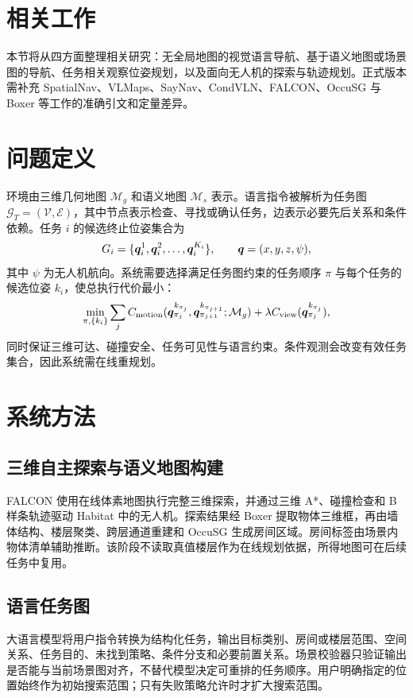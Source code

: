 \documentclass[UTF8,11pt]{ctexart}
\begin{document}
\section{相关工作}
本节将从四方面整理相关研究：无全局地图的视觉语言导航、基于语义地图或场景图的导航、任务相关观察位姿规划，以及面向无人机的探索与轨迹规划。正式版本需补充 SpatialNav、VLMaps、SayNav、CondVLN、FALCON、OccuSG 与 Boxer 等工作的准确引文和定量差异。

\section{问题定义}
环境由三维几何地图 $\mathcal{M}_g$ 和语义地图 $\mathcal{M}_s$ 表示。语言指令被解析为任务图 $\mathcal{G}_T=(\mathcal{V},\mathcal{E})$，其中节点表示检查、寻找或确认任务，边表示必要先后关系和条件依赖。任务 $i$ 的候选终止位姿集合为
\begin{equation}
G_i=\{\bm{q}_i^1,\bm{q}_i^2,\ldots,\bm{q}_i^{K_i}\},\qquad
\bm{q}=(x,y,z,\psi),
\end{equation}
其中 $\psi$ 为无人机航向。系统需要选择满足任务图约束的任务顺序 $\pi$ 与每个任务的候选位姿 $k_i$，使总执行代价最小：
\begin{equation}
\min_{\pi,\{k_i\}}\sum_j C_{\mathrm{motion}}
(\bm{q}_{\pi_j}^{k_{\pi_j}},\bm{q}_{\pi_{j+1}}^{k_{\pi_{j+1}}};\mathcal{M}_g)
+\lambda C_{\mathrm{view}}(\bm{q}_{\pi_j}^{k_{\pi_j}}),
\end{equation}
同时保证三维可达、碰撞安全、任务可见性与语言约束。条件观测会改变有效任务集合，因此系统需在线重规划。

\section{系统方法}
\subsection{三维自主探索与语义地图构建}
FALCON 使用在线体素地图执行完整三维探索，并通过三维 A*、碰撞检查和 B 样条轨迹驱动 Habitat 中的无人机。探索结果经 Boxer 提取物体三维框，再由墙体结构、楼层聚类、跨层通道重建和 OccuSG 生成房间区域。房间标签由场景内物体清单辅助推断。该阶段不读取真值楼层作为在线规划依据，所得地图可在后续任务中复用。

\subsection{语言任务图}
大语言模型将用户指令转换为结构化任务，输出目标类别、房间或楼层范围、空间关系、任务目的、未找到策略、条件分支和必要前置关系。场景校验器只验证输出是否能与当前场景图对齐，不替代模型决定可重排的任务顺序。用户明确指定的位置始终作为初始搜索范围；只有失败策略允许时才扩大搜索范围。
\end{document}
